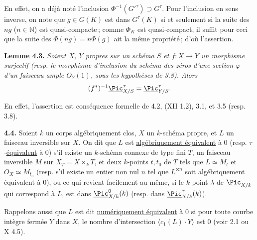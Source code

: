 
En
effet, on a d\'ej\`a not\'e l'inclusion \(\Phi^{-1}(G'^\tau)\supset G^\tau\). Pour l'inclusion en sens inverse, on note que \(g\in G(K)\) est dans \(G^\tau(K)\) si et seulement si la suite des \(ng\) (\(n\in\mathbb N\)) est quasi-compacte\,; comme \(\Phi_K\) est quasi-compact, il suffit pour ceci que la suite des \(\Phi(ng)=n\Phi(g)\) ait la m\^eme propri\'et\'e\,; d'o\`u l'assertion.

\textbf{Lemme 4.3.} \emph{Soient \(X\), \(Y\) propres sur un sch\'ema \(S\) et \(f:X\to Y\) un morphisme surjectif (resp. le morphisme d'inclusion du sch\'ema des z\'eros d'une section \(\varphi\) d'un faisceau ample \({O}_Y(1)\), sous les hypothèses de 3.8). Alors}
\[
  (f^*)^{-1}\underline{\Pic}^\tau_{X/S}=\underline{\Pic}^\tau_{Y/S}.
\]

En effet, l'assertion est cons\'equence formelle de 4.2, (XII 1.2), 3.1, et 3.5 (resp. 3.8).

\textbf{4.4.} Soient \(k\) un corps alg\'ebriquement clos, \(X\) un \(k\)-sch\'ema propre, et \(L\) un faisceau inversible sur \(X\). On dit que \(L\) est \uline{alg\'ebriquement \'equivalent} \`a \(0\) (resp. \(\tau\)-\uline{\'equivalent} \`a \(0\)) s'il existe un \(k\)-sch\'ema connexe de type fini \(T\), un faisceau inversible \(M\) sur \(X_T=X\times_k T\), et deux \(k\)-points \(t,t_0\) de \(T\) tels que \(L\simeq M_t\) et \({O}_X\simeq M_{t_0}\) (resp. s'il existe un entier non nul \(n\) tel que \(L^{\otimes n}\) soit alg\'ebriquement \'equivalent \`a \(0\)), ou ce qui revient facilement au m\^eme, si le \(k\)-point \(\lambda\) de \(\underline{\Pic}_{X/k}\) qui correspond \`a \(L\), est dans \(\underline{\Pic}^0_{X/k}(k)\) (resp. dans \(\underline{\Pic}^\tau_{X/k}(k)\)).

Rappelons aussi que \(L\) est dit \uline{num\'eriquement \'equivalent} \`a \(0\) si pour toute courbe int\`egre ferm\'ee \(Y\) dans \(X\), le nombre d'intersection \(\langle c_1(L)\cdot Y\rangle\) est \(0\) (voir 2.1 ou X 4.5).

